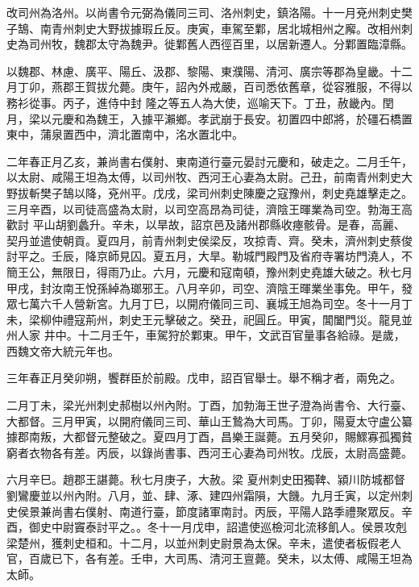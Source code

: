 \begin{pinyinscope}
 改司州為洛州。以尚書令元弼為儀同三司、洛州刺史，鎮洛陽。十一月兗州刺史樊子鵠、南青州刺史大野拔據瑕丘反。庚寅，車駕至鄴，居北城相州之廨。改相州刺史為司州牧，魏郡太守為魏尹。徙鄴舊人西徑百里，以居新遷人。分鄴置臨漳縣。



 以魏郡、林慮、廣平、陽丘、汲郡、黎陽、東濮陽、清河、廣宗等郡為皇畿。十二月丁卯，燕郡王賀拔允薨。庚午，詔內外戒嚴，百司悉依舊章，從容雅服，不得以務衫從事。丙子，進侍中封
 隆之等五人為大使，巡喻天下。丁丑，赦畿內。閏月，梁以元慶和為魏王，入據平瀨鄉。孝武崩于長安。初置四中郎將，於礓石橋置東中，蒲泉置西中，濟北置南中，洺水置北中。



 二年春正月乙亥，兼尚書右僕射、東南道行臺元晏討元慶和，破走之。二月壬午，以太尉、咸陽王坦為太傅，以司州牧、西河王心妻為太尉。己丑，前南青州刺史大野拔斬樊子鵠以降，兗州平。戊戌，梁司州刺史陳慶之寇豫州，刺史堯雄擊走之。三月辛酉，以司徒高盛為太尉，以司空高昂為司徒，濟陰王暉業為司空。勃海王高歡討
 平山胡劉蠡升。辛未，以旱故，詔京邑及諸州郡縣收瘞骸骨。是春，高麗、契丹並遣使朝貢。夏四月，前青州刺史侯梁反，攻掠青、齊。癸未，濟州刺史蔡俊討平之。壬辰，降京師見囚。夏五月，大旱。勒城門殿門及省府寺署坊門澆人，不簡王公，無限日，得雨乃止。六月，元慶和寇南頓，豫州刺史堯雄大破之。秋七月甲戌，封汝南王悅孫綽為瑯邪王。八月辛卯，司空、濟陰王暉業坐事免。甲午，發眾七萬六千人營新宮。九月丁巳，以開府儀同三司、襄城王旭為司空。冬十一月丁未，梁柳仲禮寇荊州，刺史王元擊破之。癸丑，祀圓丘。甲寅，閶闔門災。龍見並州人家
 井中。十二月壬午，車駕狩於鄴東。甲午，文武百官量事各給祿。是歲，西魏文帝大統元年也。



 三年春正月癸卯朔，饗群臣於前殿。戊申，詔百官舉士。舉不稱才者，兩免之。



 二月丁未，梁光州刺史郝樹以州內附。丁酉，加勃海王世子澄為尚書令、大行臺、大都督。三月甲寅，以開府儀同三司、華山王鷙為大司馬。丁卯，陽夏太守盧公纂據郡南叛，大都督元整破之。夏四月丁酉，昌樂王誕薨。五月癸卯，賜鰥寡孤獨貧窮者衣物各有差。丙辰，以錄尚書事、西河王心妻為司州牧。戊辰，太尉高盛薨。



 六月辛巳。趙郡王諶薨。秋七月庚子，大赦。梁
 夏州刺史田獨鞞、潁川防城都督劉鸞慶並以州內附。八月，並、肆、涿、建四州霜隕，大饑。九月壬寅，以定州刺史侯景兼尚書右僕射、南道行臺，節度諸軍南討。丙辰，平陽人路季禮聚眾反。辛酉，御史中尉竇泰討平之。。冬十一月戊申，詔遣使巡檢河北流移飢人。侯景攻剋梁楚州，獲刺史桓和。十二月，以並州刺史尉景為太保。辛未，遣使者板假老人官，百歲已下，各有差。壬申，大司馬、清河王亶薨。癸未，以太傅、咸陽王坦為太師。




\end{pinyinscope}
